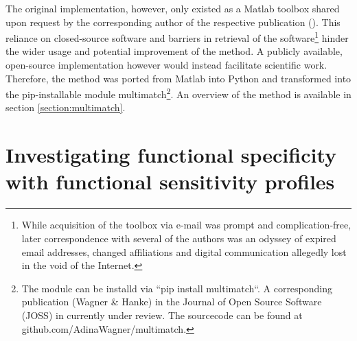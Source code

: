 \documentclass[a4paper, 12pt]{scrreprt}
\begin{document}
The original implementation, however, only existed as a Matlab toolbox shared upon request by the corresponding author of the respective publication (\cite{dewhurst2012depends}). This reliance on closed-source software and barriers in retrieval of the software\footnote{While acquisition of the toolbox via e-mail was prompt and complication-free, later correspondence with several of the authors was an odyssey of expired email addresses, changed affiliations and digital communication allegedly lost in the void of the Internet.} hinder the wider usage and potential improvement of the method. A publicly available, open-source implementation however would instead facilitate scientific work. Therefore, the method was ported from Matlab into Python and transformed into the pip-installable module multimatch\footnote{The module can be installd via ``pip install multimatch``. A corresponding publication (Wagner \& Hanke) in the Journal of Open Source Software (JOSS) in currently under review. The sourcecode can be found at github.com/AdinaWagner/multimatch.}. An overview of the method is available in section \ref{section:multimatch}.

\section{Investigating functional specificity with functional sensitivity profiles}\label{section:methodintroduction}
\end{document}
